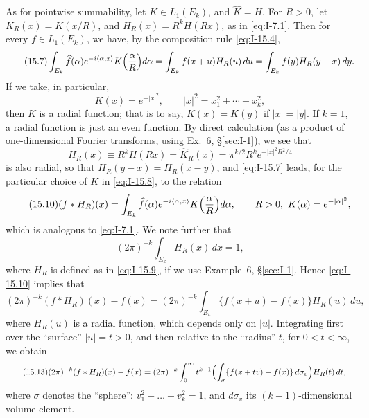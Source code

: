 As for pointwise summability, let $K\in L_1(E_k)$, and $\widehat K=H$. For $R>0$, let $K_R(x)=K(x/R)$, and $H_R(x)=R^kH(Rx)$, as in \eqref{eq:I-7.1}. Then for every $f\in L_1(E_k)$, we have, by the composition rule \eqref{eq:I-15.4},
\begin{equation}\label{eq:I-15.7}\tag{15.7}
\int_{E_k}\widehat f(\alpha)e^{-i\langle\alpha,x\rangle}K\Bigl(\frac{\alpha}{R}\Bigr)d\alpha
=\int_{E_k}f(x+u)H_R(u)\,du
=\int_{E_k}f(y)H_R(y-x)\,dy.
\end{equation}
If we take, in particular,
\begin{equation}\label{eq:I-15.8}\tag{15.8}
K(x)=e^{-|x|^{2}},\qquad |x|^{2}=x_1^{2}+\cdots+x_k^{2},
\end{equation}
then $K$ is a radial function; that is to say, $K(x)=K(y)$ if $|x|=|y|$. If $k=1$, a radial function is just an even function. By direct calculation (as a product of one-dimensional Fourier transforms, using Ex.~6, \S\ref{sec:I-1}), we see that
\begin{equation}\label{eq:I-15.9}\tag{15.9}
H_R(x)\equiv R^kH(Rx)=\widehat K_R(x)=\pi^{k/2}R^ke^{-|x|^{2}R^{2}/4}
\end{equation}
is also radial, so that $H_R(y-x)=H_R(x-y)$, and \eqref{eq:I-15.7} leads, for the particular choice of $K$ in \eqref{eq:I-15.8}, to the relation
\begin{equation}\label{eq:I-15.10}\tag{15.10}
(f*H_R)(x)=\int_{E_k}\widehat f(\alpha)e^{-i\langle\alpha,x\rangle}K\Bigl(\frac{\alpha}{R}\Bigr)d\alpha,\qquad R>0,\ K(\alpha)=e^{-|\alpha|^{2}},
\end{equation}
which is analogous to \eqref{eq:I-7.1}. We note further that
\begin{equation}\label{eq:I-15.11}\tag{15.11}
(2\pi)^{-k}\int_{E_k}H_R(x)\,dx=1,
\end{equation}
where $H_R$ is defined as in \eqref{eq:I-15.9}, if we use Example~6, \S\ref{sec:I-1}. Hence \eqref{eq:I-15.10} implies that
\begin{equation}\label{eq:I-15.12}\tag{15.12}
(2\pi)^{-k}(f*H_R)(x)-f(x)=(2\pi)^{-k}\int_{E_k}\{f(x+u)-f(x)\}H_R(u)\,du,
\end{equation}
where $H_R(u)$ is a radial function, which depends only on $|u|$. Integrating first over the ``surface'' $|u|=t>0$, and then relative to the ``radius'' $t$, for $0<t<\infty$, we obtain
\begin{equation}\label{eq:I-15.13}\tag{15.13}
\begin{aligned}
(2\pi)^{-k}(f*H_R)(x)-f(x)
&=(2\pi)^{-k}\int_{0}^{\infty}t^{k-1}\Bigl(\int_{\sigma}\{f(x+tv)-f(x)\}\,d\sigma_v\Bigr)H_R(t)\,dt,
\end{aligned}
\end{equation}
where $\sigma$ denotes the ``sphere'': $v_1^{2}+\ldots+v_k^{2}=1$, and $d\sigma_v$ its $(k-1)$-dimensional volume element.

